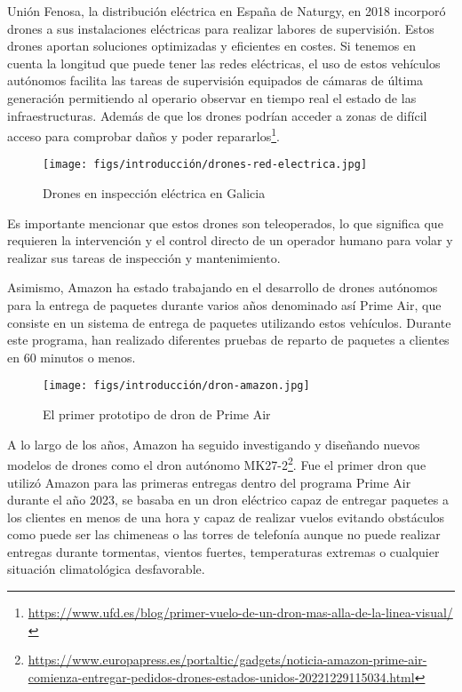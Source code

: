 Unión Fenosa, la distribución eléctrica en España de Naturgy, en 2018 incorporó drones a sus instalaciones eléctricas para realizar labores de supervisión. Estos drones aportan 
soluciones optimizadas y eficientes en costes. Si tenemos en cuenta la longitud que puede tener las redes eléctricas, el uso de estos vehículos
autónomos facilita las tareas de supervisión equipados de cámaras de última generación permitiendo al operario observar en tiempo real el estado de las infraestructuras. Además de que los
drones podrían acceder a zonas de difícil acceso para comprobar daños y poder repararlos\footnote{\url{https://www.ufd.es/blog/primer-vuelo-de-un-dron-mas-alla-de-la-linea-visual/}}.  

\begin{figure} [H]
  \begin{center}
    \texttt{[image: figs/introducción/drones-red-electrica.jpg]}
  \end{center}
  \caption{Drones en inspección eléctrica en Galicia}
  \label{fig:Fenosa}
  \vspace{-1.5em}
\end{figure}

Es importante mencionar que estos drones son teleoperados, lo que significa que requieren la intervención y el control directo de un operador humano para volar y realizar sus tareas 
de inspección y mantenimiento.

Asimismo, Amazon ha estado trabajando en el desarrollo de drones autónomos para la entrega de paquetes durante varios años denominado así Prime Air\cite{AmazonPrimeAir}, 
que consiste en un sistema de entrega de paquetes utilizando estos vehículos. Durante este programa, han realizado diferentes pruebas de reparto de paquetes a clientes
en 60 minutos o menos. 

\begin{figure} [H]
  \begin{center}
    \texttt{[image: figs/introducción/dron-amazon.jpg]}
  \end{center}
  \caption{El primer prototipo de dron de Prime Air}
  \label{fig:PrimerPrimeAir}
  \vspace{-1.5em}
\end{figure}

A lo largo de los años, Amazon ha seguido investigando y diseñando nuevos modelos de drones como el dron autónomo MK27-2\footnote{\url{https://www.europapress.es/portaltic/gadgets/noticia-amazon-prime-air-comienza-entregar-pedidos-drones-estados-unidos-20221229115034.html}}. Fue el primer 
dron que utilizó Amazon para 
las primeras entregas dentro del programa Prime Air durante el año 2023, se basaba en un dron eléctrico capaz de entregar paquetes a los clientes en menos de una
hora y capaz de realizar vuelos evitando obstáculos como puede ser las chimeneas o las torres de telefonía aunque no puede realizar entregas durante tormentas, vientos fuertes, temperaturas
extremas o cualquier situación climatológica desfavorable. 

